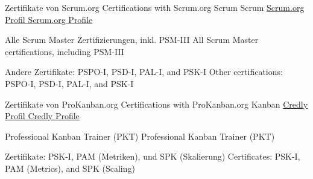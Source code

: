 {
}


\begin{cventries}

	\cventry
	{
			{ Zertifikate von Scrum.org }
			{ Certifications with Scrum.org }
	} %
	{
			{ Scrum }
			{ Scrum }
	} %
	{
		\href{https://www.scrum.org/user/601291}{
				{ Scrum.org Profil }
				{ Scrum.org Profile }
		}
	} %
	{
	} %
	{
		\begin{cvitems} %
			\item {
					{ Alle Scrum Master Zertifizierungen, inkl. PSM-III }
					{ All Scrum Master certifications, including PSM-III }
			}
			\item {
					{ Andere Zertifikate: PSPO-I, PSD-I, PAL-I, and PSK-I }
					{ Other certifications: PSPO-I, PSD-I, PAL-I, and PSK-I }
			}		
		\end{cvitems}
	}
	
	\cventry
	{ 	}
	{  	}
	{  	}
	{  	}
	{  	}
	
  	\cventry
  	{  		
  			{ Zertifikate von ProKanban.org }
  			{ Certifications with ProKanban.org }
  	} %
  	{
  		Kanban
  	} %
  	{
  		\href{https://www.credly.com/users/benjamin-huser}{
				{ Credly Profil }
				{ Credly Profile }
		}
  	} %
  	{
  	} %
  	{
  		\begin{cvitems} %
  			\item {
  				{ Professional Kanban Trainer (PKT) }
  				{ Professional Kanban Trainer (PKT) }
  			}
  			\item {
  					{ Zertifikate: PSK-I, PAM (Metriken), und SPK (Skalierung) }
  					{ Certificates: PSK-I, PAM (Metrics), and SPK (Scaling) }
  			}
  		\end{cvitems}
  	}
  	
  	\cventry
  	{ 	}
  	{  	}
  	{  	}
  	{  	}
  	{  	}
\end{cventries}
